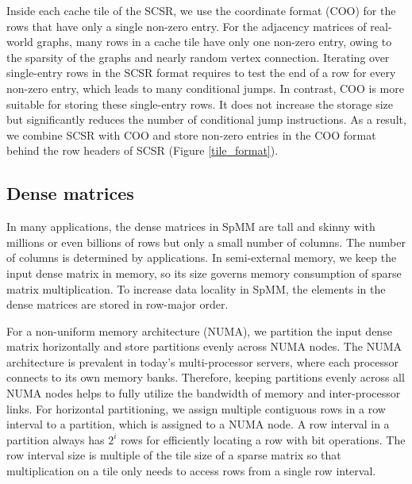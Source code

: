 Inside each cache tile of the SCSR, we use the coordinate format (COO) for
the rows that have only a single non-zero entry. For the adjacency matrices of
real-world graphs, many rows in a cache tile have only one non-zero entry,
owing to the sparsity of the graphs and nearly random vertex connection.
Iterating over single-entry rows in the SCSR format requires to test
the end of a row for every non-zero entry, which leads to many conditional jumps.
In contrast, COO is more suitable for storing these
single-entry rows. It does not increase the storage size but significantly
reduces the number of conditional jump instructions. As a result, we combine
SCSR with COO and store non-zero entries in the COO format behind the row headers
of SCSR (Figure \ref{tile_format}).


\subsection{Dense matrices}
In many applications, the dense matrices in SpMM are tall and skinny with
millions or even billions of rows but only a small number of columns.
The number of columns is determined by applications. In semi-external memory,
we keep the input dense matrix in memory, so its size governs memory consumption
of sparse matrix multiplication. To increase data locality in SpMM, the elements
in the dense matrices are stored in row-major order.

For a non-uniform memory architecture (NUMA), we partition the input dense matrix
horizontally and store partitions evenly across NUMA nodes. The NUMA architecture
is prevalent in today's multi-processor servers, where each processor connects
to its own memory banks. Therefore, keeping partitions evenly across all NUMA
nodes helps to fully utilize the bandwidth of memory and inter-processor links.
For horizontal partitioning, we assign multiple contiguous rows in a row
interval to a partition, which is assigned to a NUMA node. A row interval
in a partition always has $2^i$ rows for efficiently locating a row
with bit operations. The row interval size is multiple of the tile size of
a sparse matrix so that multiplication on a tile only needs to access rows
from a single row interval.

